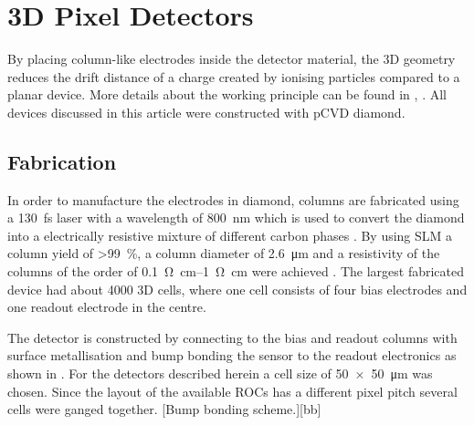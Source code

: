 \section{3D Pixel Detectors}
By placing column-like electrodes inside the detector material, the 3D geometry reduces the drift distance of a charge created by ionising particles compared to a planar device. More details about the working principle can be found in \cite{parker}, \cite{3D}. All devices discussed in this article were constructed with \ac{pCVD} diamond.
\subsection{Fabrication}
In order to manufacture the electrodes in diamond, columns are 
fabricated using a \SI{130}{\femto\second} laser with a wavelength of \SI{800}{\nano\meter} which is used to convert the diamond into a electrically resistive mixture of different carbon phases \cite{3dfab}. By using \ac{SLM} a column yield of \SI{>99}{\%}, a column diameter of \SI{2.6}{\micro\meter} and a resistivity of the columns of the order of \SIrange{.1}{1}{\ohm\centi\meter} were achieved \cite{slm}. The largest fabricated device had about 4000 3D cells, where one cell consists of four bias electrodes and one readout electrode in the centre. \par
The detector is constructed by connecting to the bias and readout columns with surface metallisation and bump bonding the sensor to the readout electronics as shown in . For the detectors described herein a cell size of \SI{50x50}{\micro\meter} was chosen. Since the layout of the available \acp{ROC} has a different pixel pitch several cells were ganged together.
[Bump bonding scheme.][bb]
